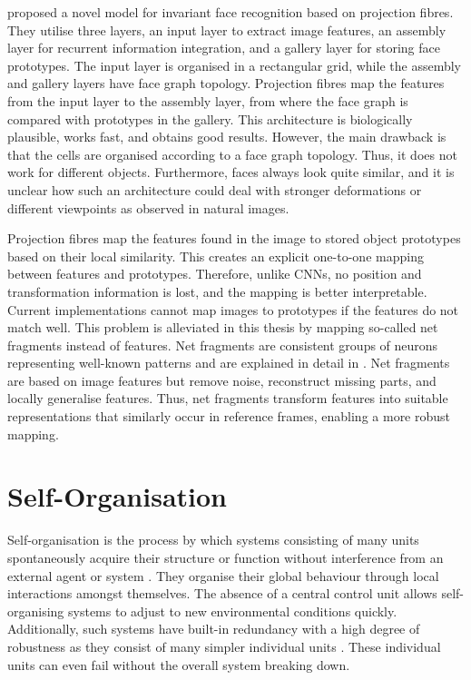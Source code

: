  proposed a novel model for invariant face recognition based on projection fibres.
They utilise three layers, an input layer to extract image features, an assembly layer for recurrent information integration, and a gallery layer for storing face prototypes.
The input layer is organised in a rectangular grid, while the assembly and gallery layers have face graph topology.
Projection fibres map the features from the input layer to the assembly layer, from where the face graph is compared with prototypes in the gallery.
This architecture is biologically plausible, works fast, and obtains good results. 
However, the main drawback is that the cells are organised according to a face graph topology. Thus, it does not work for different objects. Furthermore, faces always look quite similar, and it is unclear how such an architecture could deal with stronger deformations or different viewpoints as observed in natural images.

Projection fibres map the features found in the image to stored object prototypes based on their local similarity. This creates an explicit one-to-one mapping between features and prototypes. Therefore, unlike CNNs, no position and transformation information is lost, and the mapping is better interpretable.
Current implementations cannot map images to prototypes if the features do not match well.
This problem is alleviated in this thesis by mapping so-called net fragments instead of features.
Net fragments are consistent groups of neurons representing well-known patterns and are explained in detail in .
Net fragments are based on image features but remove noise, reconstruct missing parts, and locally generalise features. Thus, net fragments transform features into suitable representations that similarly occur in reference frames, enabling a more robust mapping.

\section{Self-Organisation}
Self-organisation is the process by which systems consisting of many units spontaneously acquire their structure or function without interference from an external agent or system .
They organise their global behaviour through local interactions amongst themselves.
The absence of a central control unit allows self-organising systems to adjust to new environmental conditions quickly.
Additionally, such systems have built-in redundancy with a high degree of robustness as they consist of many simpler individual units .
These individual units can even fail without the overall system breaking down.

